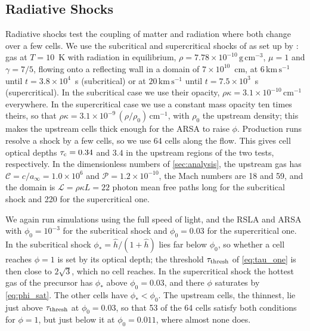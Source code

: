 \documentclass[preprint,12pt,authoryear]{elsarticle}
\newcommand{\calC}{\mathcal{C}}
\newcommand{\calP}{\mathcal{P}}
\newcommand{\calL}{\mathcal{L}}
\begin{document}
\subsection{Radiative Shocks}
\label{ssec:test_ensman}

Radiative shocks test the coupling of matter and radiation where both change over a few cells. We use the subcritical and supercritical shocks of \citet{Ensman94a} as set up by \citet{MelonFuksman21a}: gas at $T = 10$~K with radiation in equilibrium, $\rho = 7.78\times10^{-10}\,\mathrm{g\,cm^{-3}}$, $\mu = 1$ and $\gamma = 7/5$, flowing onto a reflecting wall in a domain of $7\times10^{10}$~cm, at $6\,\mathrm{km\,s^{-1}}$ until $t = 3.8\times10^4$~s (subcritical) or at $20\,\mathrm{km\,s^{-1}}$ until $t = 7.5\times10^3$~s (supercritical). In the subcritical case we use their opacity, $\rho\kappa = 3.1\times10^{-10}\,\mathrm{cm^{-1}}$ everywhere. In the supercritical case we use a constant mass opacity ten times theirs, so that $\rho\kappa = 3.1\times10^{-9}\,(\rho/\rho_0)\,\mathrm{cm^{-1}}$, with $\rho_0$ the upstream density; this makes the upstream cells thick enough for the ARSA to raise $\phi$. Production runs resolve a shock by a few cells, so we use 64 cells along the flow. This gives cell optical depths $\tau_{\rm c} = 0.34$ and $3.4$ in the upstream regions of the two tests, respectively. In the dimensionless numbers of \autoref{sec:analysis}, the upstream gas has $\calC = c/a_\infty = 1.0\times10^6$ and $\calP = 1.2\times10^{-10}$, the Mach numbers are 18 and 59, and the domain is $\calL = \rho\kappa L = 22$ photon mean free paths long for the subcritical shock and 220 for the supercritical one.

We again run simulations using the full speed of light, and the RSLA and ARSA with $\phi_0 = 10^{-3}$ for the subcritical shock and $\phi_0 = 0.03$ for the supercritical one. In the subcritical shock $\phi_* = \hat{h}/(1 + \hat{h})$ lies far below $\phi_0$, so whether a cell reaches $\phi = 1$ is set by its optical depth; the threshold $\tau_{\rm thresh}$ of \autoref{eq:tau_one} is then close to $2\sqrt{3}$, which no cell reaches. In the supercritical shock the hottest gas of the precursor has $\phi_*$ above $\phi_0 = 0.03$, and there $\phi$ saturates by \autoref{eq:phi_sat}. The other cells have $\phi_* < \phi_0$. The upstream cells, the thinnest, lie just above $\tau_{\rm thresh}$ at $\phi_0 = 0.03$, so that 53 of the 64 cells satisfy both conditions for $\phi = 1$, but just below it at $\phi_0 = 0.011$, where almost none does.
\end{document}
